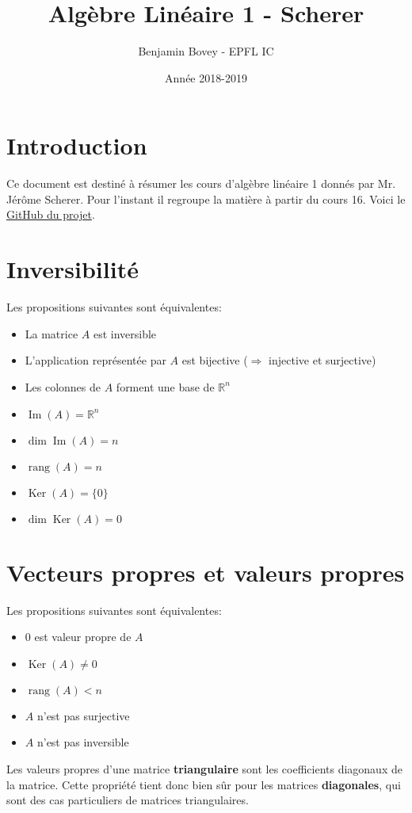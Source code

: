 \documentclass{article}
\title{Algèbre Linéaire 1 - Scherer}
\author{Benjamin Bovey -  EPFL IC}
\date{Année 2018-2019}
\numberwithin{equation}{section}
\DeclareMathOperator{\rang}{rang}
\DeclareMathOperator{\im}{Im}
\DeclareMathOperator{\ke}{Ker}
\begin{document}
\maketitle


\section*{Introduction}
Ce document est destiné à résumer les cours d'algèbre linéaire 1 donnés par Mr. Jérôme Scherer. Pour l'instant il regroupe la matière à partir du cours 16. Voici le \href{https://github.com/Arakniode/almighty-handbook-of-sleep-deprived-student}{GitHub du projet}.


\section{Inversibilité}
Les propositions suivantes sont équivalentes:
\begin{itemize}
	\item La matrice \(A\) est inversible
	\item L'application représentée par \(A\) est bijective (\(\Rightarrow\) injective et surjective)
	\item Les colonnes de \(A\) forment une base de \(\mathbb{R}^n\)
	\item \(\im(A) = \mathbb{R}^n\)
	\item \(\dim \im(A) = n\)
	\item \(\rang(A) = n\)
	\item \(\ke(A) = \{0\}\)
	\item \(\dim \ke(A) = 0\)
\end{itemize}


\section{Vecteurs propres et valeurs propres}
Les propositions suivantes sont équivalentes:
\begin{itemize}
	\item \(0\) est valeur propre de \(A\)
	\item \(\ke(A) \neq 0\)
	\item \(\rang(A) < n\)
	\item \(A\) n'est pas surjective
	\item \(A\) n'est pas inversible
\end{itemize}
Les valeurs propres d'une matrice \textbf{triangulaire} sont les coefficients diagonaux de la matrice. Cette propriété tient donc bien sûr pour les matrices \textbf{diagonales}, qui sont des cas particuliers de matrices triangulaires.
\end{document}

